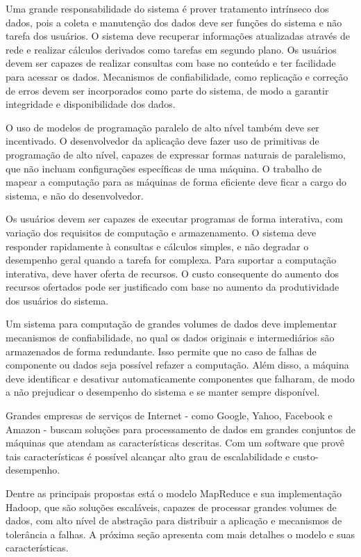 Uma grande responsabilidade do sistema é prover tratamento intrínseco dos dados, pois a coleta e manutenção dos dados deve ser funções do sistema e não tarefa dos usuários.  O sistema deve recuperar informações atualizadas através de rede e realizar cálculos derivados como tarefas em segundo plano. Os usuários devem ser capazes de realizar consultas com base no conteúdo e ter facilidade para acessar os dados. Mecanismos de confiabilidade, como replicação e  correção de erros devem ser incorporados como parte do sistema, de modo a garantir integridade e disponibilidade dos dados.

O uso de modelos de programação paralelo de alto nível também deve ser incentivado. O desenvolvedor da aplicação deve fazer uso de primitivas de programação de alto nível, capazes de expressar formas naturais de paralelismo, que não incluam configurações específicas de uma máquina. O trabalho de mapear a computação para as máquinas de forma eficiente deve ficar a cargo do sistema, e não do desenvolvedor.


Os usuários devem ser capazes de executar programas de forma interativa, com variação dos requisitos de computação e armazenamento. O sistema deve responder rapidamente à consultas e cálculos simples, e não degradar o desempenho geral quando a tarefa for complexa. 
Para suportar a computação interativa, deve haver oferta de recursos. O custo consequente do aumento dos recursos ofertados pode ser justificado com base no aumento da produtividade dos usuários do sistema.

Um sistema para computação de grandes volumes de dados deve implementar mecanismos de confiabilidade, no qual os dados originais e intermediários são armazenados de forma redundante. Isso permite que no caso de falhas de componente ou dados seja possível refazer a computação. Além disso, a máquina deve identificar e desativar automaticamente componentes que falharam, de modo a não prejudicar o desempenho do sistema e se manter sempre disponível. 


Grandes empresas de serviços de Internet - como Google, Yahoo, Facebook e Amazon - buscam soluções para processamento de dados em grandes conjuntos de máquinas que atendam as características descritas. Com um software que provê tais características é possível alcançar alto grau de escalabilidade e custo-desempenho. 

Dentre as principais propostas está o modelo MapReduce e sua implementação Hadoop, que são soluções escaláveis, capazes de processar grandes volumes de dados, com alto nível de abstração para distribuir a aplicação e mecanismos de tolerância a falhas.
A próxima seção apresenta com mais detalhes o modelo e suas características.

